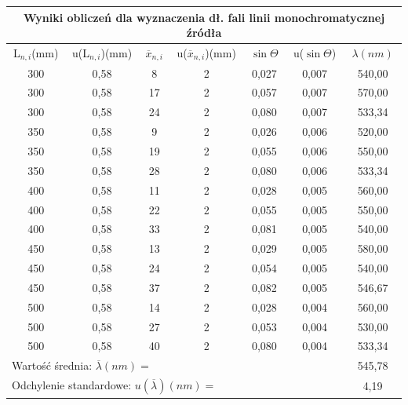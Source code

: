 \documentclass[12pt]{article}
\begin{document}
\begin{table}[!htbp]
    \centering
\begin{adjustbox}{width=1\textwidth}
    \begin{tabular}{|c|c|c|c|c|c|c|}
    \hline
    \multicolumn{7}{|c|}{Wyniki obliczeń dla wyznaczenia dł. fali linii monochromatycznej źródła} \\
    \hline
        L$_{n,i}$(mm) & u(L$_{n,i}$)(mm) & $\overline{x}_{n,i}$ & u($\overline{x}_{n,i}$)(mm) & $\sin \Theta$ & u($\sin \Theta$) & $\lambda(nm)$ \\ \hline
        300 & 0,58 & 8 & 2 & 0,027 & 0,007 & 540,00 \\ \hline
        300 & 0,58 & 17 & 2 & 0,057 & 0,007 & 570,00 \\ \hline
        300 & 0,58 & 24 & 2 & 0,080 & 0,007 & 533,34 \\ \hline
        350 & 0,58 & 9 & 2 & 0,026 & 0,006 & 520,00 \\ \hline
        350 & 0,58 & 19 & 2 & 0,055 & 0,006 & 550,00 \\ \hline
        350 & 0,58 & 28 & 2 & 0,080 & 0,006 & 533,34 \\ \hline
        400 & 0,58 & 11 & 2 & 0,028 & 0,005 & 560,00 \\ \hline
        400 & 0,58 & 22 & 2 & 0,055 & 0,005 & 550,00 \\ \hline
        400 & 0,58 & 33 & 2 & 0,081 & 0,005 & 540,00 \\ \hline
        450 & 0,58 & 13 & 2 & 0,029 & 0,005 & 580,00 \\ \hline
        450 & 0,58 & 24 & 2 & 0,054 & 0,005 & 540,00 \\ \hline
        450 & 0,58 & 37 & 2 & 0,082 & 0,005 & 546,67 \\ \hline
        500 & 0,58 & 14 & 2 & 0,028 & 0,004 & 560,00 \\ \hline
        500 & 0,58 & 27 & 2 & 0,053 & 0,004 & 530,00 \\ \hline
        500 & 0,58 & 40 & 2 & 0,080 & 0,004 & 533,34 \\ \hline
        \multicolumn{6}{|l|}{Wartość średnia: $\overline{\lambda}(nm)=$} & 545,78 \\ \hline
        \multicolumn{6}{|l|}{Odchylenie standardowe: $u(\overline{\lambda})(nm)=$} & 4,19 \\ \hline
    \end{tabular}
\end{adjustbox}
\end{table}
\end{document}
